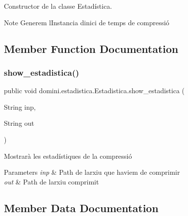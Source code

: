 Constructor de la classe Estadística. 

\begin{DoxyNote}{Note}
Generem l\textquotesingle{}Instancia d\textquotesingle{}inici de temps de compressió 
\end{DoxyNote}


\subsection{Member Function Documentation}
\mbox{\label{classdomini_1_1estadistica_1_1Estadistica_a6cac6971be817fd985afb8f3b6725464}} 
\subsubsection{\texorpdfstring{show\+\_\+estadistica()}{show\_estadistica()}}
{\footnotesize\ttfamily public void domini.\+estadistica.\+Estadistica.\+show\+\_\+estadistica (\begin{DoxyParamCaption}\item[{String}]{inp,  }\item[{String}]{out }\end{DoxyParamCaption})\hspace{0.3cm}{\ttfamily [inline]}}



Mostrarà les estadístiques de la compressió 


\begin{DoxyParams}{Parameters}
{\em inp} & Path de l\textquotesingle{}arxiu que haviem de comprimir \\
\hline
{\em out} & Path de l\textquotesingle{}arxiu comprimit \\
\hline
\end{DoxyParams}


\subsection{Member Data Documentation}
\mbox{\label{classdomini_1_1estadistica_1_1Estadistica_ae99e664f0569e308009ec7ca32864006}} 
